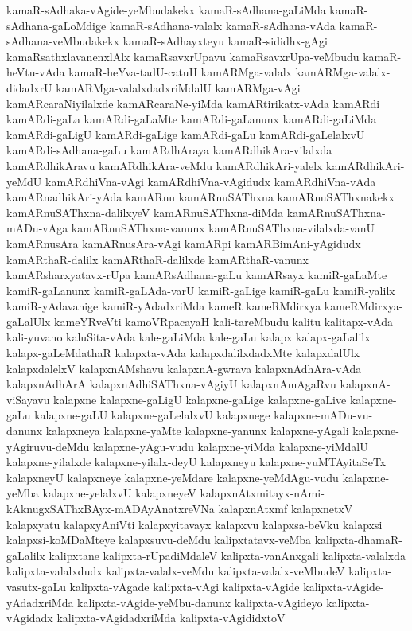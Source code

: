 {kamaR-sAdhaka-vAgide-yeMbudakekx
kamaR-sAdhana-gaLiMda
kamaR-sAdhana-gaLoMdige
kamaR-sAdhana-valalx
kamaR-sAdhana-vAda
kamaR-sAdhana-veMbudakekx
kamaR-sAdhayxteyu
kamaR-sididhx-gAgi
kamaRsathxlavanenxlAlx
kamaRsavxrUpavu
kamaRsavxrUpa-veMbudu
kamaR-heVtu-vAda
kamaR-heYva-tadU-catuH
kamARMga-valalx
kamARMga-valalx-didadxrU
kamARMga-valalxdadxriMdalU
kamARMga-vAgi
kamARcaraNiyilalxde
kamARcaraNe-yiMda
kamARtirikatx-vAda
kamARdi
kamARdi-gaLa
kamARdi-gaLaMte
kamARdi-gaLanunx
kamARdi-gaLiMda
kamARdi-gaLigU
kamARdi-gaLige
kamARdi-gaLu
kamARdi-gaLelalxvU
kamARdi-sAdhana-gaLu
kamARdhAraya
kamARdhikAra-vilalxda
kamARdhikAravu
kamARdhikAra-veMdu
kamARdhikAri-yalelx
kamARdhikAri-yeMdU
kamARdhiVna-vAgi
kamARdhiVna-vAgidudx
kamARdhiVna-vAda
kamARnadhikAri-yAda
kamARnu
kamARnuSAThxna
kamARnuSAThxnakekx
kamARnuSAThxna-dalilxyeV
kamARnuSAThxna-diMda
kamARnuSAThxna-mADu-vAga
kamARnuSAThxna-vanunx
kamARnuSAThxna-vilalxda-vanU
kamARnusAra
kamARnusAra-vAgi
kamARpi
kamARBimAni-yAgidudx
kamARthaR-dalilx
kamARthaR-dalilxde
kamARthaR-vanunx
kamARsharxyatavx-rUpa
kamARsAdhana-gaLu
kamARsayx
kamiR-gaLaMte
kamiR-gaLanunx
kamiR-gaLAda-varU
kamiR-gaLige
kamiR-gaLu
kamiR-yalilx
kamiR-yAdavanige
kamiR-yAdadxriMda
kameR
kameRMdirxya
kameRMdirxya-gaLalUlx
kameYRveVti
kamoVRpacayaH
kali-tareMbudu
kalitu
kalitapx-vAda
kali-yuvano
kaluSita-vAda
kale-gaLiMda
kale-gaLu
kalapx
kalapx-gaLalilx
kalapx-gaLeMdathaR
kalapxta-vAda
kalapxdalilxdadxMte
kalapxdalUlx
kalapxdalelxV
kalapxnAMshavu
kalapxnA-gwrava
kalapxnAdhAra-vAda
kalapxnAdhArA
kalapxnAdhiSAThxna-vAgiyU
kalapxnAmAgaRvu
kalapxnA-viSayavu
kalapxne
kalapxne-gaLigU
kalapxne-gaLige
kalapxne-gaLive
kalapxne-gaLu
kalapxne-gaLU
kalapxne-gaLelalxvU
kalapxnege
kalapxne-mADu-vu-danunx
kalapxneya
kalapxne-yaMte
kalapxne-yanunx
kalapxne-yAgali
kalapxne-yAgiruvu-deMdu
kalapxne-yAgu-vudu
kalapxne-yiMda
kalapxne-yiMdalU
kalapxne-yilalxde
kalapxne-yilalx-deyU
kalapxneyu
kalapxne-yuMTAyitaSeTx
kalapxneyU
kalapxneye
kalapxne-yeMdare
kalapxne-yeMdAgu-vudu
kalapxne-yeMba
kalapxne-yelalxvU
kalapxneyeV
kalapxnAtxmitayx-nAmi-kAknugxSAThxBAyx-mADAyAnatxreVNa
kalapxnAtxmf
kalapxnetxV
kalapxyatu
kalapxyAniVti
kalapxyitavayx
kalapxvu
kalapxsa-beVku
kalapxsi
kalapxsi-koMDaMteye
kalapxsuvu-deMdu
kalipxtatavx-veMba
kalipxta-dhamaR-gaLalilx
kalipxtane
kalipxta-rUpadiMdaleV
kalipxta-vanAnxgali
kalipxta-valalxda
kalipxta-valalxdudx
kalipxta-valalx-veMdu
kalipxta-valalx-veMbudeV
kalipxta-vasutx-gaLu
kalipxta-vAgade
kalipxta-vAgi
kalipxta-vAgide
kalipxta-vAgide-yAdadxriMda
kalipxta-vAgide-yeMbu-danunx
kalipxta-vAgideyo
kalipxta-vAgidadx
kalipxta-vAgidadxriMda
kalipxta-vAgididxtoV
}

